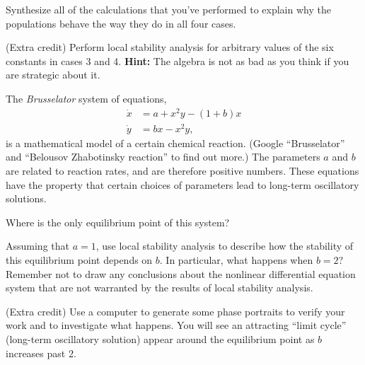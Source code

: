 \documentclass[boxes]{gsypset}
\begin{document}
\begin{problem}
\begin{subproblems}
\begin{solution}
				\end{solution}
			\subproblem 
				Synthesize all of the calculations that you've performed to explain 
				why the populations behave the way they do in all four cases.
				\begin{solution}
					
				\end{solution}
			\subproblem (Extra credit) 
				Perform local stability analysis for arbitrary values of the six constants in cases 3 and 4. 
				\textbf{Hint:} The algebra is not as bad as you think if you are strategic about it.
				\begin{solution}
					
				\end{solution}
		\end{subproblems}
	\end{problem}
	
	
	\begin{problem}
		The \textit{Brusselator} system of equations,
		\begin{align*}
			\dot{x} &= a+x^2y-(1+b)x \\
			\dot{y} &= bx-x^2y,
		\end{align*}
		is a mathematical model of a certain chemical reaction.  
		(Google ``Brusselator'' and ``Belousov Zhabotinsky reaction'' to find out more.) 
		The parameters $a$ and $b$ are related to reaction rates, and are therefore positive numbers. 
		These equations have the property that certain choices of parameters lead to 
		long-term oscillatory solutions.
		\begin{subproblems}
			\subproblem Where is the only equilibrium point of this system?
				\begin{solution}
					
				\end{solution}
			\subproblem 
				Assuming that $a=1$, use local stability analysis to 
				describe how the stability of this equilibrium point depends on $b$. 
				In particular, what happens when $b=2$? 
				Remember not to draw any conclusions about the nonlinear differential equation system 
				that are not warranted by the results of local stability analysis.
				\begin{solution}
					
				\end{solution}
			\subproblem (Extra credit) 
				Use a computer to generate some phase portraits to verify your work 
				and to investigate what happens.  
				You will see an attracting ``limit cycle'' (long-term oscillatory solution) 
				appear around the equilibrium point as $b$ increases past 2.
				\begin{solution}
					
				\end{solution}
		\end{subproblems}
	\end{problem}
	
\end{document}

